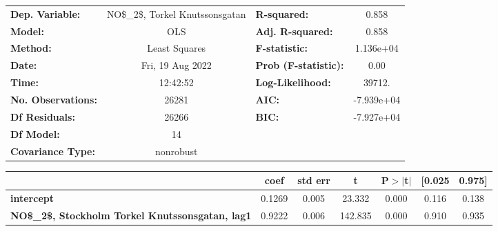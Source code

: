 \begin{landscape}
\begin{table}
\begin{center}
\begin{tabular}{lclc}
\toprule
\textbf{Dep. Variable:}                                     & NO\$\_2\$, Torkel Knutssonsgatan & \textbf{  R-squared:         } &     0.858   \\
\textbf{Model:}                                             &               OLS                & \textbf{  Adj. R-squared:    } &     0.858   \\
\textbf{Method:}                                            &          Least Squares           & \textbf{  F-statistic:       } & 1.136e+04   \\
\textbf{Date:}                                              &         Fri, 19 Aug 2022         & \textbf{  Prob (F-statistic):} &     0.00    \\
\textbf{Time:}                                              &             12:42:52             & \textbf{  Log-Likelihood:    } &    39712.   \\
\textbf{No. Observations:}                                  &               26281              & \textbf{  AIC:               } & -7.939e+04  \\
\textbf{Df Residuals:}                                      &               26266              & \textbf{  BIC:               } & -7.927e+04  \\
\textbf{Df Model:}                                          &                  14              & \textbf{                     } &             \\
\textbf{Covariance Type:}                                   &            nonrobust             & \textbf{                     } &             \\
\bottomrule
\end{tabular}
\begin{tabular}{lcccccc}
                                                            & \textbf{coef} & \textbf{std err} & \textbf{t} & \textbf{P$> |$t$|$} & \textbf{[0.025} & \textbf{0.975]}  \\
\midrule
\textbf{intercept}                                          &       0.1269  &        0.005     &    23.332  &         0.000        &        0.116    &        0.138     \\
\textbf{NO\$\_2\$, Stockholm Torkel Knutssonsgatan, lag1}   &       0.9222  &        0.006     &   142.835  &         0.000        &        0.910    &        0.935     \\

\end{tabular}
\end{center}
\end{table}
\end{landscape}
